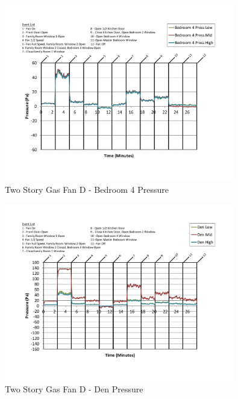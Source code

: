 \documentclass{article}
\begin{document}
\begin{appendices}
	\begin{figure}[H]
		\centering
		\includegraphics[height=3.05in,trim=0.67in 1.1in 0.67in 0.8in,clip=true]{0_Images/Results_Charts/ColdFlow/Two_Story/Gas/D/Bedroom_4_Pressure.pdf}
		\caption{Two Story Gas Fan D - Bedroom 4 Pressure}
	\end{figure}
 

	\begin{figure}[H]
		\centering
		\includegraphics[height=3.05in,trim=0.67in 1.1in 0.67in 0.8in,clip=true]{0_Images/Results_Charts/ColdFlow/Two_Story/Gas/D/Den_Pressure.pdf}
		\caption{Two Story Gas Fan D - Den Pressure}
	\end{figure}
 
	\clearpage


\end{appendices}
\end{document}
